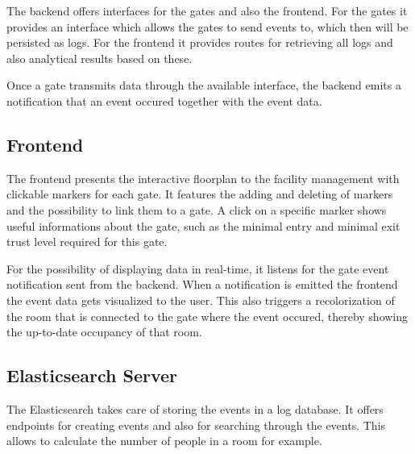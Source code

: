 The backend offers interfaces for the gates and also the frontend. For the gates it provides an interface which allows the gates to send events to, which then will be persisted as logs.
For the frontend it provides routes for retrieving all logs and also analytical results based on these.

Once a gate transmits data through the available interface, the backend emits a notification that an event occured together with the event data. 


\subsection{Frontend}
\label{Frontend}

The frontend presents the interactive floorplan to the facility management with clickable markers for each gate.
It features the adding and deleting of markers and the possibility to link them to a gate.
A click on a specific marker shows useful informations about the gate, such as the minimal entry and minimal exit trust level required for this gate.

For the possibility of displaying data in real-time, it listens for the gate event notification sent from the backend. When a notification is emitted the frontend the event data gets visualized to the user. This also triggers a recolorization of the room that is connected to the gate where the event occured, thereby showing the up-to-date occupancy of that room.

\subsection{Elasticsearch Server}
\label{Elasticsearch Server}

The Elasticsearch takes care of storing the events in a log database. It offers endpoints for creating events and also for searching through the events. This allows to calculate the number of people in a room for example.

\clearpage



